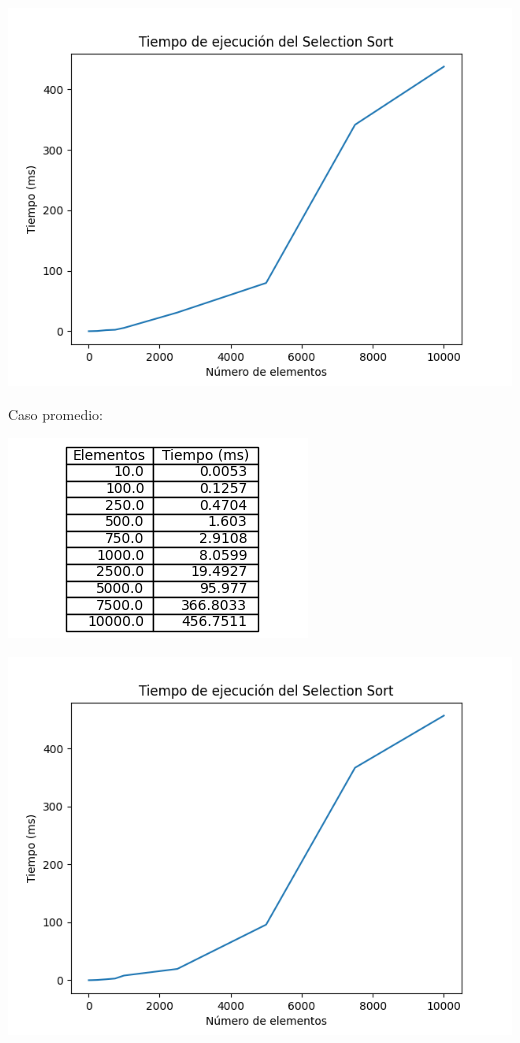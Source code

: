 \documentclass[14pt,a4paper]{report}
\begin{document}
\begin{center}
\includegraphics[scale=1]{../grafica-selection-worst.png} 
\end{center}
Caso promedio:
\begin{center}
\includegraphics[scale=1]{../tabla-selection-mean.png}  
\end{center}
\begin{center}
\includegraphics[scale=1]{../grafica-selection-mean.png} 
\end{center}
\newpage
\end{document}

